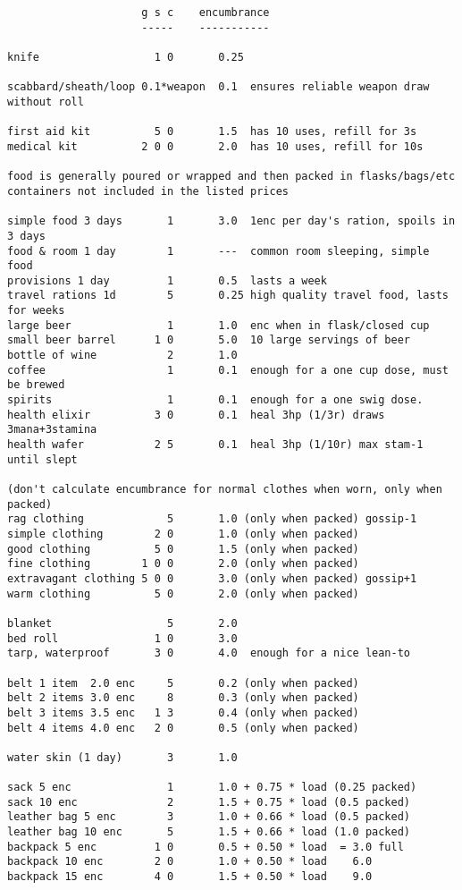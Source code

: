 \small
\begin{verbatim}
                     g s c    encumbrance
                     -----    -----------

knife                  1 0       0.25

scabbard/sheath/loop 0.1*weapon  0.1  ensures reliable weapon draw without roll

first aid kit          5 0       1.5  has 10 uses, refill for 3s
medical kit          2 0 0       2.0  has 10 uses, refill for 10s

food is generally poured or wrapped and then packed in flasks/bags/etc
containers not included in the listed prices

simple food 3 days       1       3.0  1enc per day's ration, spoils in 3 days
food & room 1 day        1       ---  common room sleeping, simple food
provisions 1 day         1       0.5  lasts a week
travel rations 1d        5       0.25 high quality travel food, lasts for weeks
large beer               1       1.0  enc when in flask/closed cup
small beer barrel      1 0       5.0  10 large servings of beer
bottle of wine           2       1.0
coffee                   1       0.1  enough for a one cup dose, must be brewed
spirits                  1       0.1  enough for a one swig dose.
health elixir          3 0       0.1  heal 3hp (1/3r) draws 3mana+3stamina
health wafer           2 5       0.1  heal 3hp (1/10r) max stam-1 until slept

(don't calculate encumbrance for normal clothes when worn, only when packed)
rag clothing             5       1.0 (only when packed) gossip-1
simple clothing        2 0       1.0 (only when packed)
good clothing          5 0       1.5 (only when packed)
fine clothing        1 0 0       2.0 (only when packed)
extravagant clothing 5 0 0       3.0 (only when packed) gossip+1
warm clothing          5 0       2.0 (only when packed)

blanket                  5       2.0
bed roll               1 0       3.0
tarp, waterproof       3 0       4.0  enough for a nice lean-to

belt 1 item  2.0 enc     5       0.2 (only when packed)
belt 2 items 3.0 enc     8       0.3 (only when packed)
belt 3 items 3.5 enc   1 3       0.4 (only when packed)
belt 4 items 4.0 enc   2 0       0.5 (only when packed)

water skin (1 day)       3       1.0

sack 5 enc               1       1.0 + 0.75 * load (0.25 packed)
sack 10 enc              2       1.5 + 0.75 * load (0.5 packed)
leather bag 5 enc        3       1.0 + 0.66 * load (0.5 packed)
leather bag 10 enc       5       1.5 + 0.66 * load (1.0 packed)
backpack 5 enc         1 0       0.5 + 0.50 * load  = 3.0 full
backpack 10 enc        2 0       1.0 + 0.50 * load    6.0
backpack 15 enc        4 0       1.5 + 0.50 * load    9.0


\end{verbatim}
